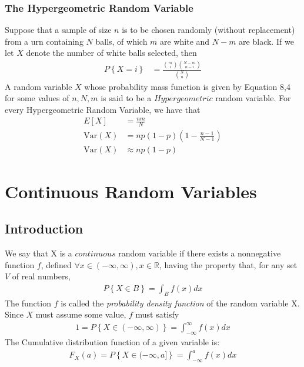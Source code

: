 \documentclass[a4paper]{article}
\begin{document}
\subsubsection{The Hypergeometric Random Variable}
Suppose that a sample of size $n$ is to be chosen randomly (without replacement) from a urn containing $N$ balls, of which $m$ are white and $N-m$ are black. If we let $X$ denote the number of white balls selected, then \\
\begin{align}
  P\left\{ X=i \right\} & = \frac{ {m \choose i} {N-m \choose n-i}}{ {N \choose n}} 
\end{align}
A random variable $X$ whose probability mass function is given by Equation 8,4 for some values of $n,N,m$ is said to be a $Hypergeometric$ random variable.
For every Hypergeometric Random Variable, we have that
\begin{align}
  E[X] &  = \frac{nm}{N} \\
  \text{Var}(X) & = np(1-p)(1- \frac{n-1}{N-1}) \\
  \text{Var}(X) & \approx np(1-p) 
\end{align}
\section{Continuous Random Variables} %
\label{sec:Continuous Random Variables}
\subsection{Introduction} %
\label{sub:Introduction}
We say that X is a $continuous$ random variable if there exists a nonnegative function $f$, defined $\forall x \in (-\infty,\infty), x \in \mathbb{R}$, having the property that, for any set $V$ of real numbers,
\begin{align}
  P\left\{ X \in B \right\} = \int_B f(x) dx
\end{align}
The function $f$ is called the \emph{probability density function} of the random variable X. Since $X$ must assume some value, $f$ must satisfy
\begin{align}
  1 = P\left\{ X \in (-\infty,\infty) \right\} = \int_{-\infty}^\infty f(x) dx
\end{align}
The Cumulative distribution function of a given variable is: 
\begin{align}
  F_X(a) = P\left\{ X \in (-\infty,a] \right\} = \int_{-\infty}^a f(x) dx
\end{align}
\end{document}
